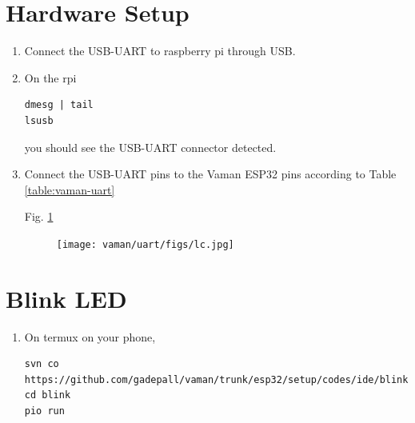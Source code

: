 \section{Hardware Setup}
\renewcommand{\theequation}{\theenumi}
\renewcommand{\thefigure}{\theenumi}
\begin{enumerate}[label=\thesection.\arabic*.,ref=\thesection.\theenumi]

\item Connect the USB-UART to raspberry pi through USB.  
\item On the rpi
\begin{lstlisting}
dmesg | tail
lsusb
\end{lstlisting}
you should see the USB-UART connector detected. 
\item Connect the USB-UART pins to the Vaman ESP32 pins according to Table 
		\ref{table:vaman-uart}
	\begin{table}[!h]
		
		\caption{}
		\label{table:vaman-uart}
	\end{table}

		Fig. \ref{fig:lc}
	\begin{figure}[!h]
		\texttt{[image: vaman/uart/figs/lc.jpg]}
		\caption{}
		\label{fig:lc}
	\end{figure}
\end{enumerate}
%
\section{Blink LED}
\renewcommand{\theequation}{\theenumi}
\renewcommand{\thefigure}{\theenumi}
\begin{enumerate}[label=\thesection.\arabic*.,ref=\thesection.\theenumi]
\item On termux on your phone, 
\begin{lstlisting}
svn co https://github.com/gadepall/vaman/trunk/esp32/setup/codes/ide/blink
cd blink
pio run
\end{lstlisting}
\end{enumerate}

